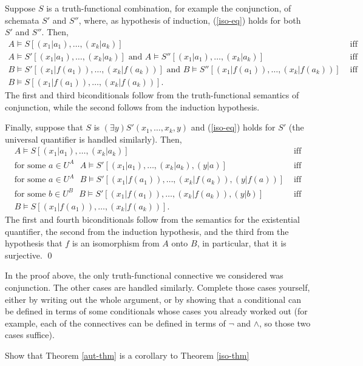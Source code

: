Suppose $S$ is a truth-functional combination, for example the conjunction, of schemata $S'$ and $S''$, where, as hypothesis of induction, (\ref{iso-eq}) holds for both $S'$ and $S''$. Then,
\[
\begin{array}{lc}
A\models S[(x_1|a_1),\ldots,(x_k|a_k)] & \mbox{ iff}\\
A\models S'[(x_1|a_1),\ldots,(x_k|a_k)]\mbox{ and }A\models S''[(x_1|a_1),\ldots,(x_k|a_k)] & \mbox{ iff}\\
B\models S'[(x_1|f(a_1)),\ldots,(x_k|f(a_k))]\mbox{ and }B\models S''[(x_1|f(a_1)),\ldots,(x_k|f(a_k))] & \mbox{ iff}\\
B\models S[(x_1|f(a_1)),\ldots,(x_k|f(a_k))].
\end{array}
\]
The first and third biconditionals follow from the truth-functional semantics of conjunction, while the second follows from the induction hypothesis.

Finally, suppose that $S$ is $(\exists y)S'(x_1,\ldots,x_k,y)$ and (\ref{iso-eq}) holds for $S'$ (the universal quantifier is handled similarly). Then,
\[
\begin{array}{lc}
A\models S[(x_1|a_1),\ldots,(x_k|a_k)] & \mbox{ iff}\\
\mbox{for some $a\in U^A$ }
A\models S'[(x_1|a_1),\ldots,(x_k|a_k),(y|a)] & \mbox{ iff}\\
\mbox{for some $a\in U^A$ }
B\models S'[(x_1|f(a_1)),\ldots,(x_k|f(a_k)),(y|f(a))] & \mbox{ iff}\\
\mbox{for some $b\in U^B$ }
B\models S'[(x_1|f(a_1)),\ldots,(x_k|f(a_k)),(y|b)] & \mbox{ iff}\\
B\models S[(x_1|f(a_1)),\ldots,(x_k|f(a_k))].
\end{array}
\]
The first and fourth biconditionals follow from the semantics for the existential quantifier, the second from the induction hypothesis, and the third from the hypothesis that $f$ is an isomorphism from $A$ onto $B$, in particular, that it is
surjective. \qed 

\begin{aside}
    In the proof above, the only truth-functional connective we considered was conjunction. The other cases are handled similarly. Complete those cases yourself, either by writing out the whole argument, or by showing that a conditional can be defined in terms of some conditionals whose cases you already worked out (for example, each of the connectives can be defined in terms of $\lnot$ and $\land$, so those two cases suffice). 
\end{aside}
\fi
\begin{aside}
    Show that Theorem \ref{aut-thm} is a corollary to Theorem \ref{iso-thm}
\end{aside}
\fi
